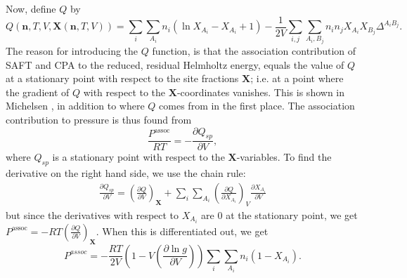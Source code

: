 \documentclass[english]{../thermomemo/thermomemo}
\newcommand{\mbf}[0]{\mathbf}
\newcommand*{\pder}[2]{\left(\frac{\partial #1}{\partial #2}\right)}
\newcommand{\lp}{\left(}
\newcommand{\rp}{\right)}
\begin{document}
Now, define $Q$ by 
\begin{equation}
  Q(\mbf n,T,V,\mathbf{X}(\mbf n, T, V)) = \sum_i \sum_{A_i} n_i \lp \ln X_{A_i} - X_{A_i} + 1\rp - \frac{1}{2V} \sum_{i,j} \sum_{A_i, B_j} n_i n_j X_{A_i} X_{B_j} \Delta^{A_i B_j}.
\end{equation}
The reason for introducing the $Q$ function, is that the association contribution of SAFT and CPA to the reduced, residual Helmholtz energy, equals the value of $Q$ at a stationary point with respect to the site fractions $\mbf X$; i.e. at a point where the gradient of $Q$ with respect to the $\mbf X$-coordinates vanishes. This is shown in Michelsen \cite{Michelsen01}, in addition to where $Q$ comes from in the first place. The association contribution to pressure is thus found from
$$
\frac{P^{\text{assoc}}}{RT} = - \frac{\partial Q_{sp}}{\partial V},
$$
where $Q_{sp}$ is a stationary point with respect to the $\mbf X$-variables. To find the derivative on the right hand side, we use the chain rule:
\begin{align*}
  \frac{\partial Q_{sp}}{\partial V} = \pder{Q}{V}_{\mbf X} + \sum_i \sum_{A_i} \pder{Q}{X_{A_i}}_V \frac{\partial X_{A_i}}{\partial V}
\end{align*}
but since the derivatives with respect to $X_{A_i}$ are $0$ at the stationary point, we get $P^{\text{assoc}} = -RT \pder{Q}{V}_{\mbf X}$. When this is differentiated out, we get
\begin{equation}
  P^{assoc} = -\frac{RT}{2V} \lp 1 - V \pder{\ln g}{V} \rp \sum_i \sum_{A_i} n_i (1-X_{A_i}).
\end{equation}
\end{document}
